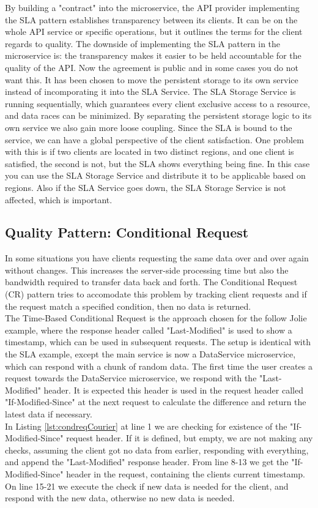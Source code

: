\documentclass[12pt]{article}
\begin{document}
By building a "contract" into the microservice, the API provider implementing the SLA pattern establishes transparency between its clients. It can be on the whole API service or specific operations, but it outlines the terms for the client regards to quality. The downside of implementing the SLA pattern in the microservice is: the transparency makes it easier to be held accountable for the quality of the API. Now the agreement is public and in some cases you do not want this. It has been chosen to move the persistent storage to its own service instead of incomporating it into the SLA Service. The SLA Storage Service is running sequentially, which guarantees every client exclusive access to a resource, and data races can be minimized. By separating the persistent storage logic to its own service we also gain more loose coupling. Since the SLA is bound to the service, we can have a global perspective of the client satisfaction. One problem with this is if two clients are located in two distinct regions, and one client is satisfied, the second is not, but the SLA shows everything being fine. In this case you can use the SLA Storage Service and distribute it to be applicable based on regions. Also if the SLA Service goes down, the SLA Storage Service is not affected, which is important. 

\subsection{Quality Pattern: Conditional Request}
In some situations you have clients requesting the same data over and over again without changes. This increases the server-side processing time but also the bandwidth required to transfer data back and forth. The Conditional Request (CR) pattern tries to accomodate this problem by tracking client requests and if the request match a specified condition, then no data is returned. \\

The Time-Based Conditional Request \cite{CondReqMAPI} is the approach chosen for the follow Jolie example, where the response header called "Last-Modified" is used to show a timestamp, which can be used in subsequent requests. The setup is identical with the SLA example, except the main service is now a DataService microservice, which can respond with a chunk of random data. The first time the user creates a request towards the DataService microservice, we respond with the "Last-Modified" header. It is expected this header is used in the request header called "If-Modified-Since" \cite{CondReqRFC} at the next request to calculate the difference and return the latest data if necessary.\\
In Listing \ref{lst:condreqCourier} at line 1 we are checking for existence of the "If-Modified-Since" request header. If it is defined, but empty, we are not making any checks, assuming the client got no data from earlier, responding with everything, and append the "Last-Modified" response header. From line 8-13 we get the "If-Modified-Since" header in the request, containing the clients current timestamp. On line 15-21 we execute the check if new data is needed for the client, and respond with the new data, otherwise no new data is needed. \\
\end{document}
